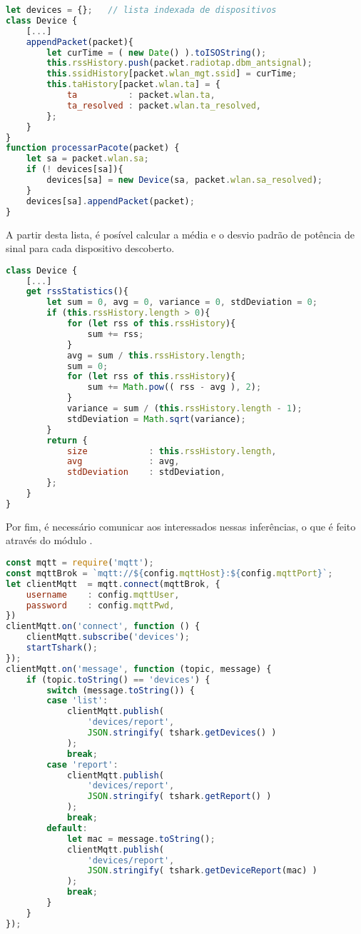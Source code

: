 \begin{lstlisting}[language=javascript,caption={Adição do pacote ao histórico do dispositivo},label=code-device-packet]
let devices = {};	// lista indexada de dispositivos
class Device {
	[...]
	appendPacket(packet){
		let curTime = ( new Date() ).toISOString();
		this.rssHistory.push(packet.radiotap.dbm_antsignal);
		this.ssidHistory[packet.wlan_mgt.ssid] = curTime;
		this.taHistory[packet.wlan.ta] = {
			ta			: packet.wlan.ta,
			ta_resolved	: packet.wlan.ta_resolved,
		};
	}
}
function processarPacote(packet) {
	let sa = packet.wlan.sa;
	if (! devices[sa]){
		devices[sa] = new Device(sa, packet.wlan.sa_resolved);
	}
	devices[sa].appendPacket(packet);
}
\end{lstlisting}

A partir desta lista, é posível calcular a média e o desvio padrão de potência de
sinal para cada dispositivo descoberto.

\begin{lstlisting}[language=javascript,caption={Extração das estatísticas do dispositivo},label=code-device-stats]
class Device {
	[...]
	get rssStatistics(){
		let sum = 0, avg = 0, variance = 0, stdDeviation = 0;
		if (this.rssHistory.length > 0){
			for (let rss of this.rssHistory){
				sum += rss;
			}
			avg = sum / this.rssHistory.length;
			sum = 0;
			for (let rss of this.rssHistory){
				sum += Math.pow(( rss - avg ), 2);
			}
			variance = sum / (this.rssHistory.length - 1);
			stdDeviation = Math.sqrt(variance);
		}
		return {
			size			: this.rssHistory.length,
			avg				: avg,
			stdDeviation	: stdDeviation,
		};
	}
}
\end{lstlisting}


Por fim, é necessário comunicar aos interessados nessas inferências, o que é
feito através do módulo .

\begin{lstlisting}[language=javascript,caption={Cliente MQTT.js},label=code-mqttjs-client]
const mqtt = require('mqtt');
const mqttBrok = `mqtt://${config.mqttHost}:${config.mqttPort}`;
let clientMqtt	= mqtt.connect(mqttBrok, {
	username	: config.mqttUser,
	password	: config.mqttPwd,
})
clientMqtt.on('connect', function () {
	clientMqtt.subscribe('devices');
	startTshark();
});
clientMqtt.on('message', function (topic, message) {
	if (topic.toString() == 'devices') {
		switch (message.toString()) {
		case 'list':
			clientMqtt.publish(
				'devices/report',
				JSON.stringify( tshark.getDevices() )
			);
			break;
		case 'report':
			clientMqtt.publish(
				'devices/report',
				JSON.stringify( tshark.getReport() )
			);
			break;
		default:
			let mac = message.toString();
			clientMqtt.publish(
				'devices/report',
				JSON.stringify( tshark.getDeviceReport(mac) )
			);
			break;
		}
	}
});
\end{lstlisting}


